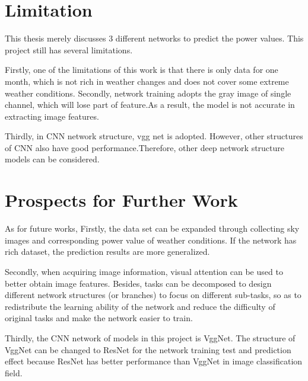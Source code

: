 \section{Limitation}
This thesis merely discusses 3 different networks to predict the power values. This project still has several limitations.

Firstly, one of the limitations of this work is that there is only data for one month, which is not rich in weather changes and does not cover some extreme weather conditions.
Secondly, network training adopts the gray image of single channel, which will lose part of feature.As a result, the model is not accurate in extracting image features.

Thirdly, in CNN network structure, vgg net is adopted. However, other structures of CNN also have good performance.Therefore, other deep network structure models can be considered.




\section{Prospects for Further Work}


As for future works, Firstly,  the data set can be expanded through collecting sky images and corresponding power value of weather conditions. If the network has rich dataset, the prediction results are more generalized.

Secondly, when acquiring image information, visual attention can be used to better obtain image features. Besides, tasks can be decomposed to design different network structures (or branches) to focus on different sub-tasks, so as to redistribute the learning ability of the network and reduce the difficulty of original tasks and make the network easier to train.

Thirdly, the CNN network of models in this project  is VggNet. The structure of VggNet can be changed to ResNet for the network training test and prediction effect because ResNet has better performance than VggNet in image classification field.







